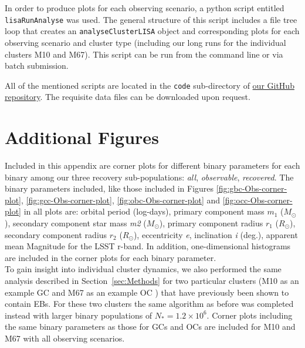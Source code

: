 \documentclass[twocolumn]{aastex63}
\begin{document}
In order to produce plots for each observing scenario, a python script entitled \texttt{lisaRunAnalyse} was used. The general structure of this script includes a file tree loop that creates an \texttt{analyseClusterLISA} object and corresponding plots for each observing scenario and cluster type (including our long runs for the individual clusters M10 and M67). This script can be run from the command line or via batch submission. 

All of the mentioned scripts are located in the \texttt{code} sub-directory of \href{https://github.com/andrewbowen19/ClusterEclipsingBinaries}{our GitHub repository}. The requisite data files can be downloaded upon request. 

\section{Additional Figures}
\label{app:Appendix B}
Included in this appendix are corner plots for different binary parameters for each binary among our three recovery sub-populations: \textit{all}, \textit{observable}, \textit{recovered}. The binary parameters included, like those included in Figures \ref{fig:gbc-Obs-corner-plot}, \ref{fig:gcc-Obs-corner-plot}, \ref{fig:obc-Obs-corner-plot} and \ref{fig:occ-Obs-corner-plot} in all plots are: orbital period (log-days), primary component mass \textit{$m_1$} ($M_{\odot}$), secondary component star mass \textit{m2} ($M_{\odot}$), primary component radius $r_1$ ($R_{\odot}$), secondary component radius $r_2$ ($R_{\odot}$), eccentricity \textit{e}, inclination \textit{i} (deg.), apparent mean Magnitude for the LSST r-band. In addition, one-dimensional histograms are included in the corner plots for each binary parameter.\\

To gain insight into individual cluster dynamics, we also performed the same analysis described in Section~\ref{sec:Methods} for two particular clusters (M10 as an example GC \citet{2003PASP..115..272V} and M67 as an example OC \citet{2016AAS...22811701S}) that have previously been shown to contain EBs. For these two clusters the same algorithm as before was completed instead with larger binary populations of $N_* = 1.2 \times 10^6$. Corner plots including the same binary parameters as those for GCs and OCs are included for M10 and M67 with all observing scenarios. \\
\end{document}
